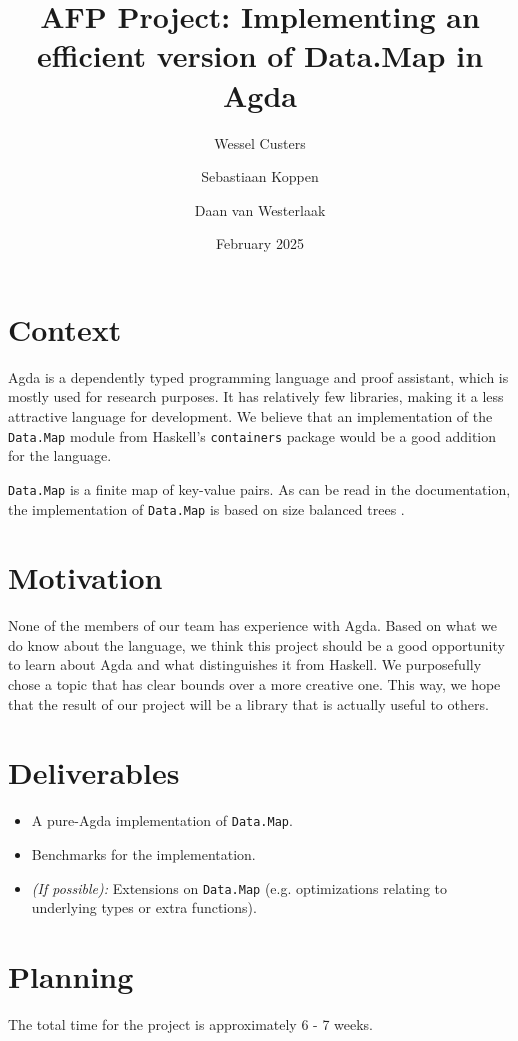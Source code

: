 \documentclass[a4paper,UKenglish,cleveref, autoref, thm-restate]{template/lipics-v2021}
\title{AFP Project: Implementing an efficient version of Data.Map in Agda}
\author{Wessel Custers}{Utrecht University, Netherlands}{}{}{}
\author{Sebastiaan Koppen}{Utrecht University, Netherlands}{}{}{}
\author{Daan van Westerlaak}{Utrecht University, Netherlands}{}{}{}
\date{February 2025}
\begin{document}
\maketitle

\section{Context}
Agda is a dependently typed programming language and proof assistant, which is mostly used for research purposes.
It has relatively few libraries, making it a less attractive language for development.
We believe that an implementation of the \texttt{Data.Map} module from Haskell's \texttt{containers} package would be a good addition for the language.

\texttt{Data.Map} is a finite map of key-value pairs. As can be read in the documentation, the implementation of \texttt{Data.Map} is based on size balanced trees \cite{adams1993functional, nievergelt1972binary}.

\section{Motivation}
None of the members of our team has experience with Agda. 
Based on what we do know about the language, we think this project should be a good opportunity to learn about Agda and what distinguishes it from Haskell.
We purposefully chose a topic that has clear bounds over a more creative one.
This way, we hope that the result of our project will be a library that is actually useful to others.

\section{Deliverables}
\begin{itemize}
    \item A pure-Agda implementation of \texttt{Data.Map}.
    \item Benchmarks for the implementation.
    \item \textit{(If possible):} Extensions on \texttt{Data.Map} (e.g. optimizations relating to underlying types or extra functions).
\end{itemize}

\section{Planning}
The total time for the project is approximately 6 - 7 weeks.
\end{document}
